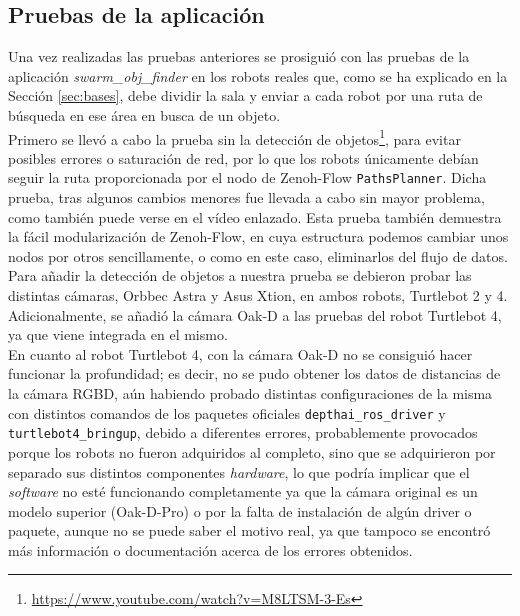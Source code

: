 \subsection{Pruebas de la aplicación}
\label{sec:pruebas_app}

Una vez realizadas las pruebas anteriores se prosiguió con las pruebas de la
aplicación \textit{swarm\_obj\_finder} en los robots reales que, como se ha
explicado en la Sección \ref{sec:bases}, debe dividir la sala y enviar a cada
robot por una ruta de búsqueda en ese área en busca de un objeto.
\\

Primero se llevó a cabo la prueba sin la detección de objetos\footnote{
\href{https://www.youtube.com/watch?v=M8LTSM-3-Es}{https://www.youtube.com/watch?v=M8LTSM-3-Es}},
para evitar posibles errores o saturación de red, por lo que los robots
únicamente debían seguir la ruta proporcionada por el nodo de Zenoh-Flow
\verb|PathsPlanner|.
Dicha prueba, tras algunos cambios menores fue llevada a cabo sin mayor
problema, como también puede verse en el vídeo enlazado.
Esta prueba también demuestra la fácil modularización de Zenoh-Flow, en cuya
estructura podemos cambiar unos nodos por otros sencillamente, o como en este
caso, eliminarlos del flujo de datos.
\\

Para añadir la detección de objetos a nuestra prueba se debieron probar las
distintas cámaras, Orbbec Astra y Asus Xtion, en ambos robots, Turtlebot 2 y 4.
Adicionalmente, se añadió la cámara Oak-D a las pruebas del robot Turtlebot 4,
ya que viene integrada en el mismo.
\\

En cuanto al robot Turtlebot 4, con la cámara Oak-D no se consiguió hacer
funcionar la profundidad; es decir, no se pudo obtener los datos de distancias
de la cámara RGBD, aún habiendo probado distintas configuraciones de la misma
con distintos comandos de los paquetes oficiales \texttt{depthai\_ros\_driver} y
\texttt{turtlebot4\_bringup}, debido a diferentes errores, probablemente
provocados porque los robots no fueron adquiridos al completo, sino que se
adquirieron por separado sus distintos componentes \textit{hardware}, lo que
podría implicar que el \textit{software} no esté funcionando completamente ya
que la cámara original es un modelo superior (Oak-D-Pro) o por la falta de
instalación de algún driver o paquete, aunque no se puede saber el motivo real,
ya que tampoco se encontró más información o documentación acerca de los errores
obtenidos.
\\

